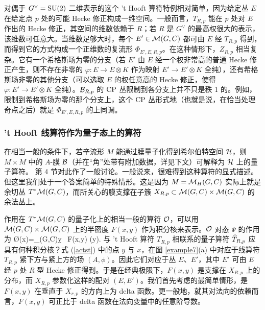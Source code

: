 对偶于 $G^\vee={\mathrm{SU}}(2)$ 二维表示的这个 't Hooft 算符特例相对简单，因为给定丛 $E$ 在给定点 $p$ 处的可能 Hecke 修正构成一维空间。一般而言，$T_{R,p}$ 能在 $p$ 处对 $E$ 作出的 Hecke 修正，其空间的维数依赖于 $R$；若 $R$ 是 $G^\vee$ 的最高权很大的表示，该维数可任意大。当维数足够大时，每个 $E'\in {\mathcal M}(G,C)$ 都可由 $E$ 经 $T_{R,p}$ 得到，而得到它的方式构成一个正维数的复流形 $\Phi_{E',E,R,p}$。在这种情形下，$Z_{R,p}$ 相当复杂。它有一个希格斯场为零的分支（若 $E'$ 由 $E$ 经一个权非常高的普通 Hecke 修正产生，则不存在非零的 $\varphi:E\to E\otimes K$ 作为映射 $E'\to E'\otimes K$ 全纯），还有希格斯场非零的其他分支（可以选取 $E$ 的权任意高的 Hecke 修正，使得 $\varphi:E'\to E'\otimes K$ 全纯）。${\mathcal B}_{R,p}$ 的 ${\mathrm{CP}}$ 丛限制到各分支上并不只是秩 1 的。例如，限制到希格斯场为零的那个分支上，这个 ${\mathrm{CP}}$ 丛形式地（也就是说，在恰当处理奇点之后）就是 $\Phi_{E',E,R,p}$ 的上同调。
 
\subsubsection{'t Hooft 线算符作为量子态上的算符}\label{lineq}
   
在相当一般的条件下，若辛流形 $M$ 能通过膜量子化得到希尔伯特空间 ${\mathcal H}$，则 $M\times M$ 中的 $A$-膜 ${\mathcal B}$（并在“角”处带有附加数据，详见下文）可解释为 ${\mathcal H}$ 上的量子算符。\cite{GW} 第 4 节对此作了一般讨论。一般说来，很难得到这种算符的显式描述。但这里我们处于一个答案简单的特殊情形。这是因为 $M={\mathcal M}_H(G,C)$ 实际上就是余切丛 $T^*{\mathcal M}(G,C)$，而所关心的膜支撑在子簇 $X_{R,p}\subset {\mathcal M}(G,C) \times {\mathcal M}(G,C)$ 的余法丛上。
 
作用在 $T^*{\mathcal M}(G,C)$ 的量子化上的相当一般的算符 ${\mathcal O}$，可以用 ${\mathcal M}(G,C)\times {\mathcal M}(G,C)$ 上的半密度 $F(x,y)$ 作为积分核来表示。${\mathcal O}$ 对态 $\Psi$ 的作用为
\be\label{actst} \O\Psi(x)=\int_{\M(G,C)}\d y \, F(x,y) \Psi(y). \ee
与 't Hooft 算符 $T_{R,p}$ 相联系的量子算符 $\widehat T_{R,p}$ 应具有何种积分核？式 (\ref{actst}) 中的点 $y$ 与 $x$，在图 \ref{example7}(a) 中对应于线算符 $T_{R,p}$ 紧下方与紧上方的场 $(A,\phi)$。因此它们对应于丛 $E$、$E'$，其中 $E'$ 可由 $E$ 经 $p$ 处 $R$ 型 Hecke 修正得到。于是在经典极限下，$F(x,y)$ 是支撑在 $X_{R,p}$ 上的分布，而 $X_{R,p}$ 参数化这样的配对 $(E,E')$。我们首先考虑的最简单情形，是 $F(x,y)$ 在垂直于 $X_{r,p}$ 的方向上为 delta 函数。更一般地，就其对法向的依赖而言，$F(x,y)$ 可正比于 delta 函数在法向变量中的任意阶导数。

